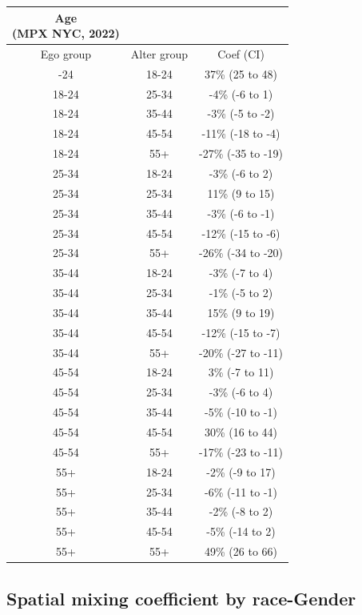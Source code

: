 \documentclass[
  letterpaper,
  DIV=11,
  numbers=noendperiod,
  oneside]{scrreprt}
\begin{document}
\begin{longtable*}{ccc}
\caption*{
{\large Age} \\ 
{\small (MPX NYC, 2022)}
} \\ 
\toprule
Ego group & Alter group & Coef (CI) \\ 
\midrule{}-24 & 18-24 & 37\% (25 to 48)  \\ 
18-24 & 25-34 & -4\% (-6 to 1)  \\ 
18-24 & 35-44 & -3\% (-5 to -2)  \\ 
18-24 & 45-54 & -11\% (-18 to -4)  \\ 
18-24 & 55+ & -27\% (-35 to -19)  \\ 
25-34 & 18-24 & -3\% (-6 to 2)  \\ 
25-34 & 25-34 & 11\% (9 to 15)  \\ 
25-34 & 35-44 & -3\% (-6 to -1)  \\ 
25-34 & 45-54 & -12\% (-15 to -6)  \\ 
25-34 & 55+ & -26\% (-34 to -20)  \\ 
35-44 & 18-24 & -3\% (-7 to 4)  \\ 
35-44 & 25-34 & -1\% (-5 to 2)  \\ 
35-44 & 35-44 & 15\% (9 to 19)  \\ 
35-44 & 45-54 & -12\% (-15 to -7)  \\ 
35-44 & 55+ & -20\% (-27 to -11)  \\ 
45-54 & 18-24 & 3\% (-7 to 11)  \\ 
45-54 & 25-34 & -3\% (-6 to 4)  \\ 
45-54 & 35-44 & -5\% (-10 to -1)  \\ 
45-54 & 45-54 & 30\% (16 to 44)  \\ 
45-54 & 55+ & -17\% (-23 to -11)  \\ 
55+ & 18-24 & -2\% (-9 to 17)  \\ 
55+ & 25-34 & -6\% (-11 to -1)  \\ 
55+ & 35-44 & -2\% (-8 to 2)  \\ 
55+ & 45-54 & -5\% (-14 to 2)  \\ 
55+ & 55+ & 49\% (26 to 66)  \\ 
\bottomrule
\end{longtable*}

\hypertarget{spatial-mixing-coefficient-by-race-gender}{%
\subsection*{Spatial mixing coefficient by
race-Gender}\label{spatial-mixing-coefficient-by-race-gender}}
\end{document}
